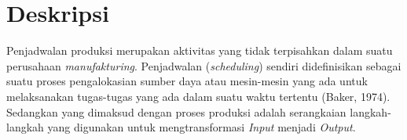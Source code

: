 \documentclass[a4paper,twoside]{article}
\begin{document}
\title{\@judultopik}
\author{\nama \textendash \@npm} 

\newcommand{\nama}{Kevin Jonathan}
\newcommand{\@npm}{2014730020}
\newcommand{\@judultopik}{Ant Colony Optimization (ACO) untuk Permasalahan Multi Objective Flowshop Scheduling (MOFSP)} %
\newcommand{\jumpemb}{1} %
\newcommand{\tanggal}{14/02/2018}


\maketitle


\section{Deskripsi}






Penjadwalan produksi merupakan aktivitas yang tidak terpisahkan dalam suatu perusahaan {\it manufakturing}. Penjadwalan ({\it scheduling}) sendiri didefinisikan sebagai suatu proses pengalokasian sumber daya atau mesin-mesin yang ada untuk melaksanakan tugas-tugas yang ada dalam suatu waktu tertentu (Baker, 1974). Sedangkan yang dimaksud dengan proses produksi adalah serangkaian langkah-langkah yang digunakan untuk mengtransformasi {\it Input} menjadi {\it Output}.
\end{document}
